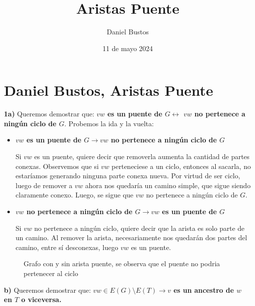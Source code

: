 \documentclass{article}
\title{Aristas Puente}
\author{Daniel Bustos}
\date{11 de mayo 2024}
\begin{document}
\section*{Daniel Bustos, Aristas Puente}

\textbf{1a)} Queremos demostrar que: \textbf{$vw$ es un puente de $G \leftrightarrow$ $vw$ no pertenece a ningún ciclo de $G$}. Probemos la ida y la vuelta:
\begin{itemize}


\item \textbf{ $vw$ es un puente de $G \rightarrow vw$ no pertenece a ningún ciclo de $G$}

Si $vw$ es un puente, quiere decir que removerla aumenta la cantidad de partes conexas. Observemos que si $vw$ perteneciese a un ciclo, entonces al sacarla, no estaríamos generando ninguna parte conexa nueva. Por virtud de ser ciclo, luego de remover a $vw$ ahora nos quedaría un camino simple, que sigue siendo claramente conexo. Luego, se sigue que $vw$ no pertenece a ningún ciclo de $G$.

\item \textbf{$vw$ no pertenece a ningún ciclo de $G \rightarrow vw$ es un puente de $G$}

Si $vw$ no pertenece a ningún ciclo, quiere decir que la arista es solo parte de un camino. Al remover la arista, necesariamente nos quedarán dos partes del camino, entre sí desconexas, luego $vw$ es un puente.
\end{itemize}
\begin{figure}[h]
    \centering
    \hspace{1cm}
    \caption{Grafo con y sin arista puente, se observa que el puente no podria pertenecer al ciclo}
\end{figure}
\textbf{b)} Queremos demostrar que: \textbf{$vw \in E(G) \setminus E(T) \rightarrow v$ es un ancestro de $w$ en $T$ o viceversa.}
\end{document}
